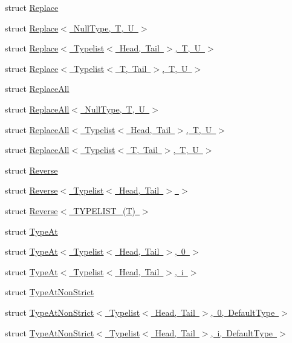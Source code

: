 \begin{DoxyCompactItemize}
\item 
struct \mbox{\hyperlink{structUtil_1_1TL_1_1Replace}{Replace}}
\item 
struct \mbox{\hyperlink{structUtil_1_1TL_1_1Replace_3_01NullType_00_01T_00_01U_01_4}{Replace$<$ Null\+Type, T, U $>$}}
\item 
struct \mbox{\hyperlink{structUtil_1_1TL_1_1Replace_3_01Typelist_3_01Head_00_01Tail_01_4_00_01T_00_01U_01_4}{Replace$<$ Typelist$<$ Head, Tail $>$, T, U $>$}}
\item 
struct \mbox{\hyperlink{structUtil_1_1TL_1_1Replace_3_01Typelist_3_01T_00_01Tail_01_4_00_01T_00_01U_01_4}{Replace$<$ Typelist$<$ T, Tail $>$, T, U $>$}}
\item 
struct \mbox{\hyperlink{structUtil_1_1TL_1_1ReplaceAll}{Replace\+All}}
\item 
struct \mbox{\hyperlink{structUtil_1_1TL_1_1ReplaceAll_3_01NullType_00_01T_00_01U_01_4}{Replace\+All$<$ Null\+Type, T, U $>$}}
\item 
struct \mbox{\hyperlink{structUtil_1_1TL_1_1ReplaceAll_3_01Typelist_3_01Head_00_01Tail_01_4_00_01T_00_01U_01_4}{Replace\+All$<$ Typelist$<$ Head, Tail $>$, T, U $>$}}
\item 
struct \mbox{\hyperlink{structUtil_1_1TL_1_1ReplaceAll_3_01Typelist_3_01T_00_01Tail_01_4_00_01T_00_01U_01_4}{Replace\+All$<$ Typelist$<$ T, Tail $>$, T, U $>$}}
\item 
struct \mbox{\hyperlink{structUtil_1_1TL_1_1Reverse}{Reverse}}
\item 
struct \mbox{\hyperlink{structUtil_1_1TL_1_1Reverse_3_01Typelist_3_01Head_00_01Tail_01_4_01_4}{Reverse$<$ Typelist$<$ Head, Tail $>$ $>$}}
\item 
struct \mbox{\hyperlink{structUtil_1_1TL_1_1Reverse_3_01TYPELIST__1_07T_08_01_4}{Reverse$<$ T\+Y\+P\+E\+L\+I\+S\+T\+\_(\+T) $>$}}
\item 
struct \mbox{\hyperlink{structUtil_1_1TL_1_1TypeAt}{Type\+At}}
\item 
struct \mbox{\hyperlink{structUtil_1_1TL_1_1TypeAt_3_01Typelist_3_01Head_00_01Tail_01_4_00_010_01_4}{Type\+At$<$ Typelist$<$ Head, Tail $>$, 0 $>$}}
\item 
struct \mbox{\hyperlink{structUtil_1_1TL_1_1TypeAt_3_01Typelist_3_01Head_00_01Tail_01_4_00_01i_01_4}{Type\+At$<$ Typelist$<$ Head, Tail $>$, i $>$}}
\item 
struct \mbox{\hyperlink{structUtil_1_1TL_1_1TypeAtNonStrict}{Type\+At\+Non\+Strict}}
\item 
struct \mbox{\hyperlink{structUtil_1_1TL_1_1TypeAtNonStrict_3_01Typelist_3_01Head_00_01Tail_01_4_00_010_00_01DefaultType_01_4}{Type\+At\+Non\+Strict$<$ Typelist$<$ Head, Tail $>$, 0, Default\+Type $>$}}
\item 
struct \mbox{\hyperlink{structUtil_1_1TL_1_1TypeAtNonStrict_3_01Typelist_3_01Head_00_01Tail_01_4_00_01i_00_01DefaultType_01_4}{Type\+At\+Non\+Strict$<$ Typelist$<$ Head, Tail $>$, i, Default\+Type $>$}}
\end{DoxyCompactItemize}
